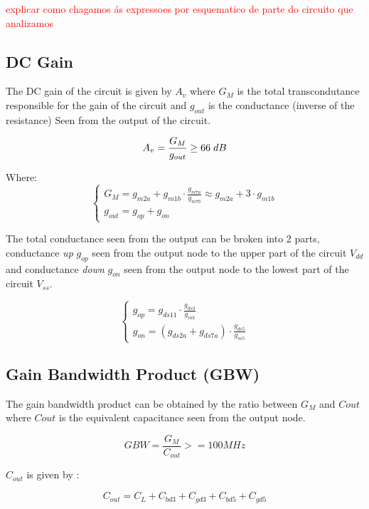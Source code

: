 \textcolor{red}{explicar como chagamos ás expressoes por esquematico de parte do circuito que analizamos}
\subsection {DC Gain}

The DC gain of the circuit is given by $A_v$ where $G_M$ is the total transcondutance responsible for the gain of the circuit and $g_{out}$ is the conductance (inverse of the resistance) Seen from the output of the circuit.

$$A_v =  \frac{G_M}{g_{out}} \geq 66\hspace{0.1cm}dB$$

Where:
\begin{equation}
    \begin{cases}
        G_M = g_{m2a} + g_{m1b} \cdot \frac{g_{m7a}}{g_{m7b}} \approx g_{m2a} + 3 \cdot g_{m1b} \\
        g_{out} = g_{op} + g_{on}
    \end{cases}
\end{equation}

The total conductance seen from the output can be broken into 2 parts, conductance \textit{up} $g_{op}$ seen from the output node to the upper part of the circuit $V_{dd}$ and conductance \textit{down} $g_{on}$ seen from the output node to the lowest part of the circuit $V_{ss}$.

\begin{equation}
    \begin{cases}
        g_{op} = g_{ds11} \cdot \frac{g_{ds3}}{g_{m3}} \\
        g_{on} = \left( g_{ds2a} + g_{ds7a} \right) \cdot \frac{g_{ds5}}{g_{m5}}
    \end{cases}
\end{equation}

\subsection{Gain Bandwidth Product (GBW)}
The gain bandwidth product can be obtained by the ratio between $G_M$ and $C{out}$ where $C{out}$ is the equivalent capacitance seen from the output node.

$$  GBW = \frac{G_M}{C_{out}} >= 100 MHz $$

$C_{out}$ is given by :

$$C_{out} = C_L + C_{bd3} + C_{gd3} + C_{bd5} + C_{gd5}$$

\newpage

